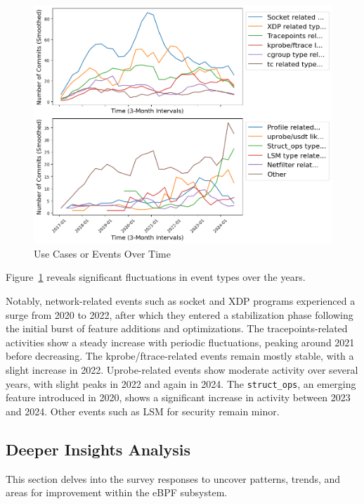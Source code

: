 \begin{figure}[ht]
    \centering
    \includegraphics[width=\linewidth]{feature-analysis/timeline_usecases_or_submodule_events_smoothed.png}
    \caption{Use Cases or Events Over Time}
    \label{fig:timeline_usecases_or_submodule_events_smoothed}
\end{figure}

Figure~\ref{fig:timeline_usecases_or_submodule_events_smoothed} reveals significant fluctuations in event types over the years.

Notably, network-related events such as socket and XDP programs experienced a surge from 2020 to 2022, after which they entered a stabilization phase following the initial burst of feature additions and optimizations. The tracepoints-related activities show a steady increase with periodic fluctuations, peaking around 2021 before decreasing. The kprobe/ftrace-related events remain mostly stable, with a slight increase in 2022. Uprobe-related events show moderate activity over several years, with slight peaks in 2022 and again in 2024. The \texttt{struct\_ops}, an emerging feature introduced in 2020, shows a significant increase in activity between 2023 and 2024. Other events such as LSM for security remain minor.

\subsection{Deeper Insights Analysis}

This section delves into the survey responses to uncover patterns, trends, and areas for improvement within the eBPF subsystem.

